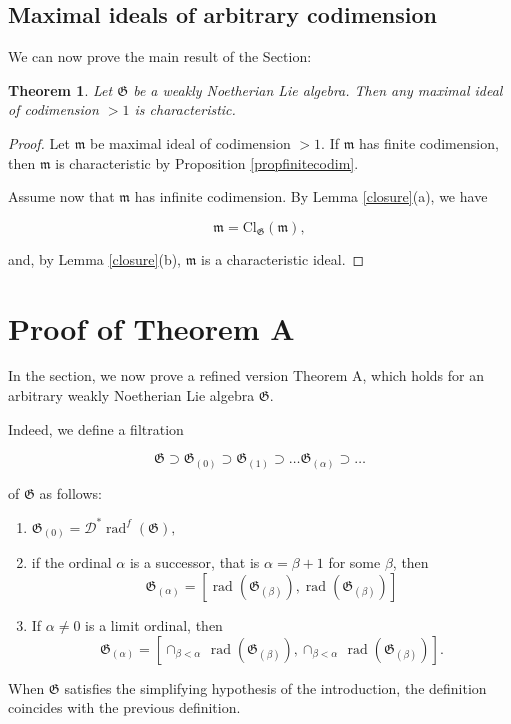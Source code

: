 \documentclass[11pt, letterpaper, reqno]{amsart}
\newtheorem{theorem}{Theorem}
\theoremstyle{definition}
\newcommand{\rad}{\operatorname{rad}}
\newcommand{\cD}{\mathscr D}
\newcommand{\fm}{\mathfrak{m}}
\newcommand{\fG}{\mathfrak{G}}
\newcommand{\Cl}{\mathrm{Cl}}
\begin{document}
\subsection{Maximal ideals of arbitrary codimension}

We can now prove the main result of the Section:


\begin{theorem}\label{characteristic} Let $\fG$ be a weakly Noetherian Lie algebra. Then any
maximal ideal  of codimension $>1$ is characteristic.
\end{theorem}

\begin{proof} Let $\fm$ be maximal ideal  of codimension $>1$. If $\fm$ has finite codimension, then 
$\fm$ is characteristic by Proposition \ref{propfinitecodim}.

Assume now that  $\fm$ has infinite codimension.
By  Lemma \ref{closure}(a), we have

$$\fm=\Cl_{\fG}(\fm),$$

 \noindent and, by Lemma \ref{closure}(b),
 $\fm$ is a characteristic ideal.
 \end{proof}

\section{Proof of Theorem A}\label{proofA}

In the section, we now prove a refined version  Theorem A,
which holds for an arbitrary weakly Noetherian Lie algebra $\fG$.

Indeed,  we define  a filtration

$$\fG\supset \fG_{(0)}\supset \fG_{(1)}\supset \ldots\fG_{(\alpha)}\supset\ldots$$ 

\noindent of $\fG$ as follows:

\begin{enumerate}
\item[(a)] \hskip27mm$\fG_{(0)}=\cD^*\rad^f(\fG),$
\item[(b)] if the ordinal $\alpha$ is a successor,
that is $\alpha=\beta+1$ for some $\beta$, then
$$\fG_{(\alpha)}=
[\rad(\fG_{(\beta)}),\rad(\fG_{(\beta)})]$$
\item[(c)] If $\alpha\neq 0$ is a limit ordinal, then
$$\fG_{(\alpha)}=[\cap_{\beta<\alpha}\,\rad(\fG_{(\beta)}), \cap_{\beta<\alpha}\,\rad(\fG_{(\beta)})].$$
\end{enumerate}

\noindent When $\fG$ satisfies the simplifying hypothesis of the 
introduction, the definition coincides with the previous definition.
\end{document}
